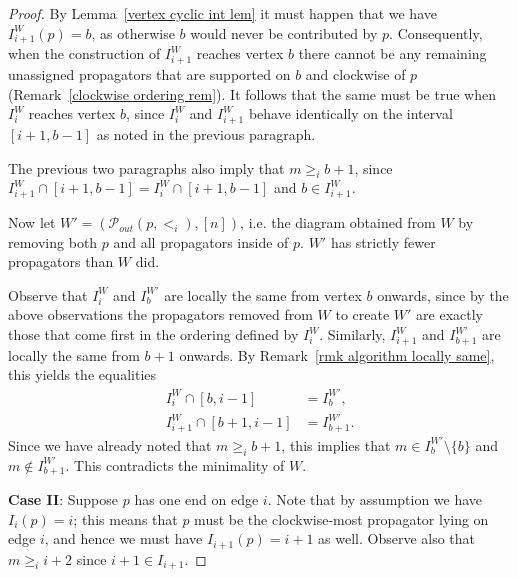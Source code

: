 \documentclass[11pt]{article}
\newcommand{\sanote}{\todo[color=violet!30]}
\newcommand{\cP}{\mathcal{P}}
\theoremstyle{remark}
\theoremstyle{definition}
\begin{document}
\begin{proof}
By Lemma~\ref{vertex cyclic int lem} it must happen that we have $I_{i+1}^W(p) = b$, as otherwise $b$ would never be contributed by $p$.  Consequently, when the construction of $I_{i+1}^W$ reaches vertex $b$ there cannot be any remaining unassigned propagators that are supported on $b$ and clockwise of $p$ (Remark~\ref{clockwise ordering rem}). It follows that the same must be true when $I_i^W$ reaches vertex $b$, since $I_i^W$ and $I_{i+1}^W$ behave identically on the interval $[i+1,b-1]$ as noted in the previous paragraph. 

The previous two paragraphs also imply that $m \geq_i b+1$, since $I_{i+1}^W \cap [i+1,b-1] = I_{i}^W \cap [i+1,b-1]$ and $b \in I_{i+1}^W$.


Now let $W' = (\cP_{out}(p,<_i), [n])$, i.e. the diagram obtained from $W$ by removing both $p$ and all propagators inside of $p$. $W'$ has strictly fewer propagators than $W$ did.

Observe that $I_i^W$ and $I_b^{W'}$ are locally the same from vertex $b$ onwards, since by the above observations the propagators removed from $W$ to create $W'$ are exactly those that come first in the ordering defined by $I_i^W$. Similarly, $I_{i+1}^W$ and $I_{b+1}^{W'}$ are locally the same from $b+1$ onwards. By Remark~\ref{rmk algorithm locally same}, this yields the equalities
\begin{align*}
  I_i^{W} \cap [b,i-1] & = I_b^{W'}, \\
  I_{i+1}^{W} \cap [b+1,i-1] & = I_{b+1}^{W'}.
\end{align*} 
Since we have already noted that $m \geq_i b+1$, this implies that $m\in I_b^{W'}\setminus\{b\}$ and $m\not\in I_{b+1}^{W'}$. This contradicts the minimality of $W$.

\textbf{Case II}: Suppose $p$ has one end on edge $i$.  Note that by assumption we have $I_i(p) = i$; this means that $p$ must be the clockwise-most propagator lying on edge $i$, and hence we must have $I_{i+1}(p) = i+1$ as well.  Observe also that $m\geq_i i+2$ since $i+1\in I_{i+1}$.


\end{proof}
\end{document}

